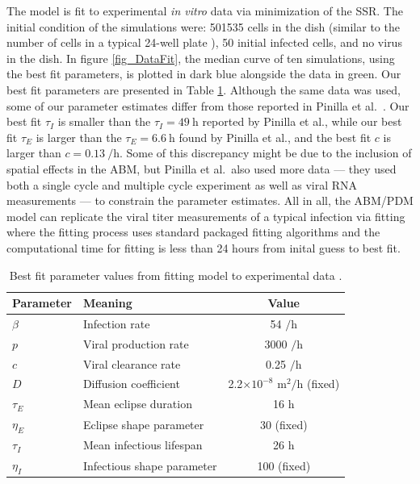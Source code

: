 The model is fit to experimental \emph{in vitro} data \citep{pinilla12} via minimization of the SSR. The initial condition of the simulations were: 501535 cells in the dish (similar to the number of cells in a typical 24-well plate \citep{Number_of_cells_in_a_dish_noauthor_useful_nodate}), 50 initial infected cells, and no virus in the dish. In figure \ref{fig_DataFit}, the median curve of ten simulations, using the best fit parameters, is plotted in dark blue alongside the data in green. Our best fit parameters are presented in Table \ref{tab_datafit_params}. Although the same data was used, some of our parameter estimates differ from those reported in Pinilla et al.\ \citep{pinilla12}. Our best fit $\tau_I$ is smaller than the $\tau_I = \SI{49}{\hour}$ reported by Pinilla et al., while our best fit $\tau_E$ is larger than the $\tau_E = \SI{6.6}{\hour}$ found by Pinilla et al., and the best fit $c$ is larger than $c = \SI{0.13}{\per\hour}$. Some of this discrepancy might be due to the inclusion of spatial effects in the ABM, but Pinilla et al.\ also used more data --- they used both a single cycle and multiple cycle experiment as well as viral RNA measurements --- to constrain the parameter estimates. All in all, the ABM/PDM model can replicate the viral titer measurements of a typical infection via fitting where the fitting process uses standard packaged fitting algorithms and the computational time for fitting is less than 24 hours from inital guess to best fit.

\begin{table}
\centering
\caption{Best fit parameter values from fitting model to experimental data \citep{pinilla12}. \label{tab_datafit_params}}
\begin{tabular}{llc}
\hline
Parameter & Meaning & Value \\
\hline
$\beta$ & Infection rate & 54 $/\mathrm{h}$ \\
$p$ & Viral production rate & 3000 $/\mathrm{h}$ \\
$c$ & Viral clearance rate & 0.25 $/\mathrm{h}$ \\
$D$ & Diffusion coefficient & 2.2$\times 10^{-8}$ $\mathrm{m}^2/\mathrm{h}$ (fixed) \\
$\tau_E$ & Mean eclipse duration & 16 $\mathrm{h}$ \\
$\eta_E$ & Eclipse shape parameter & 30 (fixed) \\
$\tau_I$ & Mean infectious lifespan & 26 $\mathrm{h}$ \\
$\eta_I$ & Infectious shape parameter & 100 (fixed) \\
\end{tabular}
\end{table}

